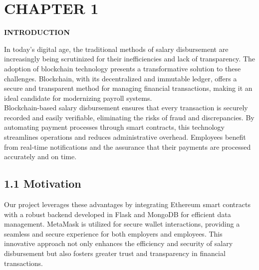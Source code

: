 \documentclass[12pt]{report}
\begin{document}
\newpage
\section*{CHAPTER 1}
\begin{center}
    \textbf{\fontsize{18pt}{21.6pt}\selectfont INTRODUCTION}  %
\end{center}
\vspace{0.2em}
\begin{center}    
    \justify %
In today's digital age, the traditional methods of salary disbursement are increasingly being scrutinized for their inefficiencies and lack of transparency. The adoption of blockchain technology presents a transformative solution to these challenges. Blockchain, with its decentralized and immutable ledger, offers a secure and transparent method for managing financial transactions, making it an ideal candidate for modernizing payroll systems. \\
   Blockchain-based salary disbursement ensures that every transaction is securely recorded and easily verifiable, eliminating the risks of fraud and discrepancies. By automating payment processes through smart contracts, this technology streamlines operations and reduces administrative overhead. Employees benefit from real-time notifications and the assurance that their payments are processed accurately and on time. \\

 
\end{center}
\vspace{0.7em}
\subsection*{1.1 Motivation}
\begin{center}    
    \justify %
Our project leverages these advantages by integrating Ethereum smart contracts with a robust backend developed in Flask and MongoDB for efficient data management. MetaMask is utilized for secure wallet interactions, providing a seamless and secure experience for both employers and employees. This innovative approach not only enhances the efficiency and security of salary disbursement but also fosters greater trust and transparency in financial transactions.
\end{center}
\end{document}
